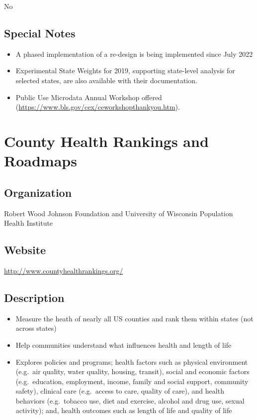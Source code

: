 \documentclass[
]{book}
\providecommand{\tightlist}{%
  \setlength{\itemsep}{0pt}\setlength{\parskip}{0pt}}
\begin{document}
No

\hypertarget{special-notes-18}{%
\section{Special Notes}\label{special-notes-18}}

\begin{itemize}
\tightlist
\item
  A phased implementation of a re-design is being implemented since July 2022
\item
  Experimental State Weights for 2019, supporting state-level analysis for selected states, are also available with their documentation.
\item
  Public Use Microdata Annual Workshop offered (\url{https://www.bls.gov/cex/ceworkshopthankyou.htm}).
\end{itemize}

\mainmatter

\hypertarget{county-health-rankings-and-roadmaps}{%
\chapter{County Health Rankings and Roadmaps}\label{county-health-rankings-and-roadmaps}}

\hypertarget{organization-19}{%
\section{Organization}\label{organization-19}}

Robert Wood Johnson Foundation and University of Wisconsin Population Health Institute

\hypertarget{website-19}{%
\section{Website}\label{website-19}}

\url{http://www.countyhealthrankings.org/}

\hypertarget{description-19}{%
\section{Description}\label{description-19}}

\begin{itemize}
\tightlist
\item
  Measure the heath of nearly all US counties and rank them within states (not across states)
\item
  Help communities understand what influences health and length of life
\item
  Explores policies and programs; health factors such as physical environment (e.g.~air quality, water quality, housing, transit), social and economic factors (e.g.~education, employment, income, family and social support, community safety), clinical care (e.g.~access to care, quality of care), and health behaviors (e.g.~tobacco use, diet and exercise, alcohol and drug use, sexual activity); and, health outcomes such as length of life and quality of life
\end{itemize}
\end{document}
